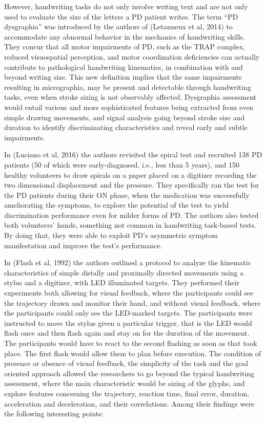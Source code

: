 However, handwriting tasks do not only involve writing text and are not only used to evaluate the size of the letters a \gls{PD} patient writes. The term ``PD dysgraphia'' was introduced by the authors of (Letanneux et al, 2014) to accommodate any abnormal behavior in the mechanics of handwriting skills. They concur that all motor impairments of \gls{PD}, such as the \gls{TRAP} complex, reduced visuospatial perception, and motor coordination deficiencies can actually contribute to pathological handwriting kinematics, in combination with and beyond writing size. This new definition implies that the same impairments resulting in micrographia, may be present and detectable through handwriting tasks, even when stroke sizing is not observably affected. Dysgraphia assessment would entail various and more sophisticated features being extracted from even simple drawing movements, and signal analysis going beyond stroke size and duration to identify discriminating characteristics and reveal early and subtle impairments. 

In (Luciano et al, 2016) the authors revisited the spiral test and recruited 138 \gls{PD} patients (50 of which were early-diagnosed, i.e., less than 5 years), and 150 healthy volunteers to draw spirals on a paper placed on a digitizer recording the two dimensional displacement and the pressure. They specifically ran the test for the \gls{PD} patients during their ON phase, when the medication was successfully ameliorating the symptoms, to explore the potential of the test to yield discrimination performance even for milder forms of \gls{PD}. The authors also tested both volunteers' hands, something not common in handwriting task-based tests. By doing that, they were able to exploit \gls{PD}'s asymmetric symptom manifestation and improve the test's performance. 

In (Flash et al, 1992) the authors outlined a protocol to analyze the kinematic characteristics of simple distally and proximally directed movements using a stylus and a digitizer, with \gls{LED} illuminated targets. They performed their experiments both allowing for visual feedback, where the participants could see the trajectory drawn and monitor their hand, and without visual feedback, where the participants could only see the \gls{LED}-marked targets. The participants were instructed to move the stylus given a particular trigger, that is the LED would flash once and then flash again and stay on for the duration of the movement. The participants would have to react to the second flashing as soon as that took place. The first flash would allow them to plan before execution. The condition of presence or absence of visual feedback, the simplicity of the task and the goal oriented approach allowed the researchers to go beyond the typical handwriting assessment, where the main characteristic would be sizing of the glyphs, and explore features concerning the trajectory, reaction time, final error, duration, acceleration and deceleration, and their correlations. Among their findings were the following interesting points:

